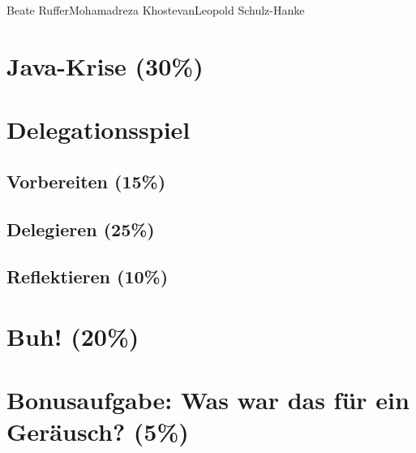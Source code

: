 \documentclass{pi1}
\begin{document}
		{Beate Ruffer}{Mohamadreza Khostevan}{Leopold Schulz-Hanke}

\section{Java-Krise (30\%)}

\section{Delegationsspiel}

\subsection{Vorbereiten (15\%)}

\subsection{Delegieren (25\%)}

\subsection{Reflektieren (10\%)}

\section{Buh! (20\%)}

\section{Bonusaufgabe: Was war das für ein Geräusch? (5\%)}

\begin{lstlisting}[caption={Klasse \emph{Obstacle}}, firstnumber=3, language=Java]

\end{lstlisting}
\end{document}

